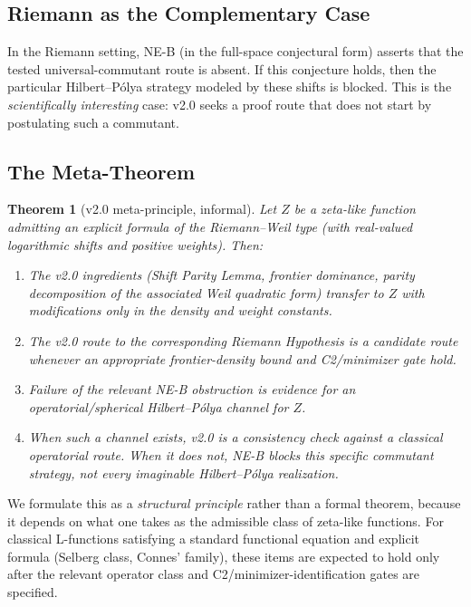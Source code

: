 \documentclass[12pt,a4paper]{article}
\newtheorem{theorem}{Theorem}[section]
\theoremstyle{definition}
\theoremstyle{remark}
\begin{document}
\subsection{Riemann as the Complementary Case}

In the Riemann setting, NE-B (in the full-space conjectural form) asserts that
the tested universal-commutant route is absent. If this conjecture holds, then
the particular Hilbert--Pólya strategy modeled by these shifts is blocked.
This is the \emph{scientifically interesting} case: v2.0 seeks a proof route
that does not start by postulating such a commutant.

\subsection{The Meta-Theorem}

\begin{theorem}[v2.0 meta-principle, informal]
\label{thm:meta}
Let $Z$ be a zeta-like function admitting an explicit formula of the
Riemann--Weil type (with real-valued logarithmic shifts and positive weights).
Then:
\begin{enumerate}[label=(\roman*)]
\item The v2.0 ingredients (Shift Parity Lemma, frontier dominance,
parity decomposition of the associated Weil quadratic form) transfer to $Z$
with modifications only in the density and weight constants.
\item The v2.0 route to the corresponding Riemann Hypothesis is a candidate
route whenever an appropriate frontier-density bound and C2/minimizer gate hold.
\item Failure of the relevant NE-B obstruction is evidence for an
operatorial/spherical Hilbert--Pólya channel for $Z$.
\item When such a channel exists, v2.0 is a consistency check against a
classical operatorial route. When it does not, NE-B blocks this specific
commutant strategy, not every imaginable Hilbert--Pólya realization.
\end{enumerate}
\end{theorem}

We formulate this as a \emph{structural principle} rather than a formal
theorem, because it depends on what one takes as the admissible class of
zeta-like functions. For classical L-functions satisfying a standard
functional equation and explicit formula (Selberg class, Connes' family),
these items are expected to hold only after the relevant operator class and
C2/minimizer-identification gates are specified.
\end{document}

